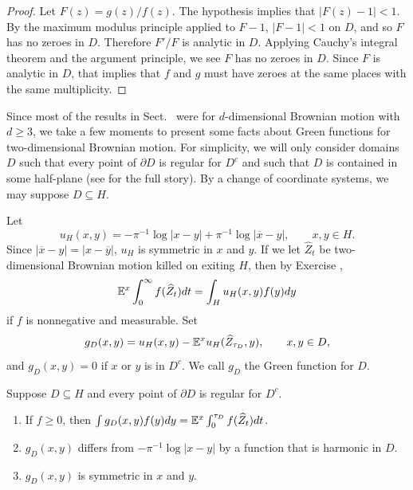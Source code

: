 \begin{proof}
Let $F(z) = g(z)/f(z)$. The hypothesis implies that $|F(z) - 1| < 1$. By the maximum modulus principle applied to $F - 1$, $|F - 1| < 1$ on $D$, and so $F$ has no zeroes in $D$. Therefore $F'/F$ is analytic in $D$. Applying Cauchy's integral theorem and the argument principle, we see $F$ has no zeroes in $D$. Since $F$ is analytic in $D$, that implies that $f$ and $g$ must have zeroes at the same places with the same multiplicity.
\end{proof}


Since most of the results in Sect.\  were for $d$-dimensional Brownian motion with $d \geq 3$, we take a few moments to present some facts about Green functions for two-dimensional Brownian motion. For simplicity, we will only consider domains $D$ such that every point of $\partial D$ is regular for $D^c$ and such that $D$ is contained in some half-plane (see \cite{PortStone1978} for the full story). By a change of coordinate systems, we may suppose $D \subseteq H$.

Let
\begin{equation}\label{eq:ch5_1.6}
    u_H(x,y) = -\pi^{-1}\log|x-y| + \pi^{-1}\log|\overline{x}-y|, \qquad x,y \in H.
\end{equation}
Since $|\overline{x}-y| = |x-\overline{y}|$, $u_H$ is symmetric in $x$ and $y$. If we let $\widehat{Z}_t$ be two-dimensional Brownian motion killed on exiting $H$, then by Exercise ,
\[
    \mathbb{E}^x\int_0^\infty f(\widehat{Z}_t)dt = \int_H u_H(x,y)f(y)dy
\]
if $f$ is nonnegative and measurable. Set
\begin{equation}\label{eq:ch5_1.7}
    g_D(x,y) = u_H(x,y) - \mathbb{E}^xu_H(\widehat{Z}_{\tau_D},y), \qquad x,y \in D,
\end{equation}
and $g_D(x,y) = 0$ if $x$ or $y$ is in $D^c$. We call $g_D$ the Green function for $D$.

\begin{proposition}\label{prop:ch5_1.13}
Suppose $D \subseteq H$ and every point of $\partial D$ is regular for $D^c$.
\begin{enumerate}
    \item If $f \geq 0$, then $\int g_D(x,y)f(y)dy = \mathbb{E}^x\int_0^{\tau_D} f(\widehat{Z}_t)dt$.
    \item $g_D(x,y)$ differs from $-\pi^{-1}\log|x-y|$ by a function that is harmonic in $D$.
    \item $g_D(x,y)$ is symmetric in $x$ and $y$.
\end{enumerate}
\end{proposition}

